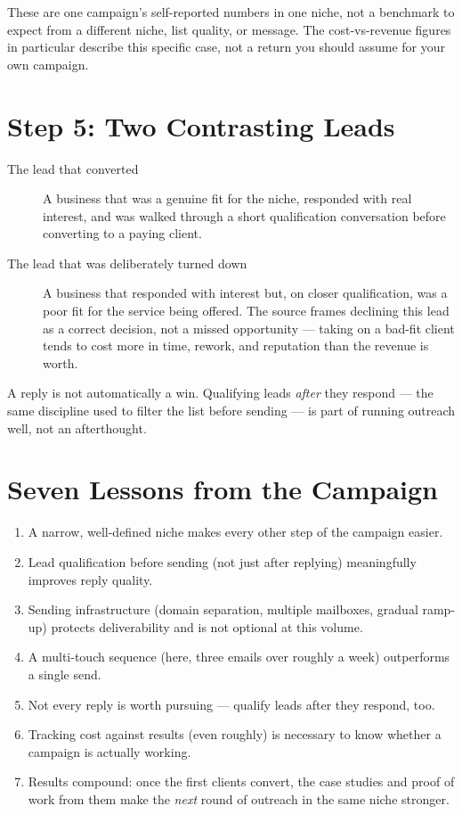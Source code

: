 \begin{caution}
These are one campaign's self-reported numbers in one niche, not a benchmark to expect from a different
niche, list quality, or message. The cost-vs-revenue figures in particular describe this specific case, not a
return you should assume for your own campaign.
\end{caution}

\section{Step 5: Two Contrasting Leads}

\begin{description}
  \item[The lead that converted] A business that was a genuine fit for the niche, responded with real interest,
  and was walked through a short qualification conversation before converting to a paying client.
  \item[The lead that was deliberately turned down] A business that responded with interest but, on closer
  qualification, was a poor fit for the service being offered. The source frames declining this lead as a
  correct decision, not a missed opportunity — taking on a bad-fit client tends to cost more in time, rework, and
  reputation than the revenue is worth.
\end{description}

\begin{keytakeaway}
A reply is not automatically a win. Qualifying leads \emph{after} they respond — the same discipline used to
filter the list before sending — is part of running outreach well, not an afterthought.
\end{keytakeaway}

\section{Seven Lessons from the Campaign}

\begin{enumerate}
  \item A narrow, well-defined niche makes every other step of the campaign easier.
  \item Lead qualification before sending (not just after replying) meaningfully improves reply quality.
  \item Sending infrastructure (domain separation, multiple mailboxes, gradual ramp-up) protects deliverability
  and is not optional at this volume.
  \item A multi-touch sequence (here, three emails over roughly a week) outperforms a single send.
  \item Not every reply is worth pursuing — qualify leads after they respond, too.
  \item Tracking cost against results (even roughly) is necessary to know whether a campaign is actually working.
  \item Results compound: once the first clients convert, the case studies and proof of work from them make the
  \emph{next} round of outreach in the same niche stronger.
\end{enumerate}

